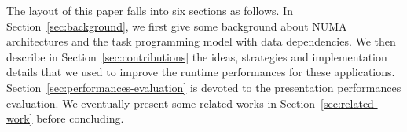 \documentclass{Styles/llncs}
\newcommand{\TG}[1]{{\color{red}\bfseries TG: #1}}
\begin{document}
The layout of this paper falls into six sections as follows.
In Section~\ref{sec:background}, we first give some background about NUMA architectures
and the task programming model with data dependencies.
We  then describe in Section~\ref{sec:contributions} the ideas, strategies and implementation details that we used to improve the runtime performances
for these applications. Section~\ref{sec:performances-evaluation} is devoted to the presentation performances evaluation.
We eventually present some related works in Section~\ref{sec:related-work}
before concluding.

%

\end{document}
